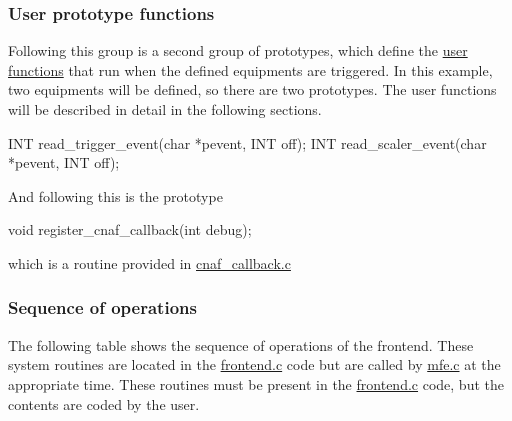 \par
 \hypertarget{FE_code_sections_FE_user_prototypes}{}\subsubsection{User prototype functions}\label{FE_code_sections_FE_user_prototypes}
Following this group is a second group of prototypes, which define the \hyperlink{FrontendOperation_FE_equipment_readout_function}{user functions} that run when the defined equipments are triggered. In this example, two equipments will be defined, so there are two prototypes. The user functions will be described in detail in the following sections. 
\begin{DoxyCode}
INT read_trigger_event(char *pevent, INT off);
INT read_scaler_event(char *pevent, INT off);
\end{DoxyCode}


And following this is the prototype 
\begin{DoxyCode}
void register_cnaf_callback(int debug);
\end{DoxyCode}
 which is a routine provided in \hyperlink{cnaf__callback_8c}{cnaf\_\-callback.c}

\par
  \par


\label{index_end}
\hypertarget{index_end}{}
 \subsubsection{Sequence of operations}\label{FE_sequence}
\par
  \par


\label{FE_sequence_idx_Frontend_sequence-of-operations}
\hypertarget{FE_sequence_idx_Frontend_sequence-of-operations}{}
 The following table shows the sequence of operations of the frontend. These system routines are located in the \hyperlink{frontend_8c}{frontend.c} code but are called by \hyperlink{mfe_8c}{mfe.c} at the appropriate time. These routines must be present in the \hyperlink{frontend_8c}{frontend.c} code, but the contents are coded by the user.

